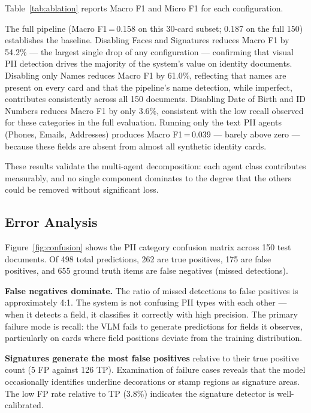 Table~\ref{tab:ablation} reports Macro F1 and
Micro F1 for each configuration.

The full pipeline (Macro F1\,=\,0.158 on this
30-card subset; 0.187 on the full 150) establishes
the baseline.
Disabling Faces and Signatures reduces Macro F1 by
54.2\% --- the largest single drop of any
configuration --- confirming that visual PII
detection drives the majority of the system's value
on identity documents.
Disabling only Names reduces Macro F1 by 61.0\%,
reflecting that names are present on every card
and that the pipeline's name detection, while
imperfect, contributes consistently across all
150 documents.
Disabling Date of Birth and ID Numbers reduces
Macro F1 by only 3.6\%, consistent with the
low recall observed for these categories
in the full evaluation.
Running only the text PII agents (Phones, Emails,
Addresses) produces Macro F1\,=\,0.039 ---
barely above zero --- because these fields are
absent from almost all synthetic identity cards.

These results validate the multi-agent decomposition:
each agent class contributes measurably, and no
single component dominates to the degree that the
others could be removed without significant loss.

\subsection{Error Analysis}

Figure~\ref{fig:confusion} shows the PII category
confusion matrix across 150 test documents.
Of 498 total predictions, 262 are true positives,
175 are false positives, and 655 ground truth
items are false negatives (missed detections).

\textbf{False negatives dominate.}
The ratio of missed detections to false positives
is approximately 4:1.
The system is not confusing PII types with each
other --- when it detects a field, it classifies
it correctly with high precision.
The primary failure mode is recall: the VLM fails
to generate predictions for fields it observes,
particularly on cards where field positions deviate
from the training distribution.

\textbf{Signatures generate the most false positives}
relative to their true positive count
(5 FP against 126 TP).
Examination of failure cases reveals that the
model occasionally identifies underline decorations
or stamp regions as signature areas.
The low FP rate relative to TP (3.8\%) indicates
the signature detector is well-calibrated.

